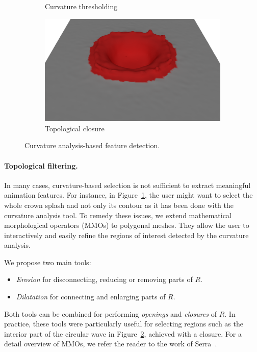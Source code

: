 \begin{figure}[t]
\begin{subfigure}[b]{0.45\linewidth}
    \caption{\label{fig:curvatureThreshold}Curvature thresholding}
    \end{subfigure}
    \hspace{0.1cm}
    \begin{subfigure}[b]{0.45\linewidth}
    \centering
    \includegraphics[width=\textwidth]{images/fluidsculpting-mig2016/featureZone.eps}
    \caption{\label{fig:featureZone}Topological closure}
    \end{subfigure}
    \caption[Fluid sculpting: Feature detection]{
\label{fig:curvature_analysis}
Curvature analysis-based feature detection.
}
\end{figure}

\paragraph*{Topological filtering.}
In many cases, curvature-based selection is not sufficient to extract meaningful animation features. 
For instance, in Figure~\ref{fig:curvatureThreshold}, the user might want to select the whole crown splash and not only its contour as it has been done with the curvature analysis tool. 
To remedy these issues, we extend mathematical morphological operators (MMOs) to polygonal meshes.
They allow the user to interactively and easily refine the regions of interest detected by the curvature analysis.

We propose two main tools:
\begin{itemize}
 \item \emph{Erosion} for disconnecting, reducing or removing parts of $R$.
 \item \emph{Dilatation} for connecting and enlarging parts of $R$.
\end{itemize}
Both tools can be combined for performing \emph{openings} and \emph{closures} of $R$.
In practice, these tools were particularly useful for selecting regions such as the interior part of the circular wave in Figure~\ref{fig:featureZone}, achieved with a closure.
For a detail overview of MMOs, we refer the reader to the work of Serra~\cite{Serra1986}.

